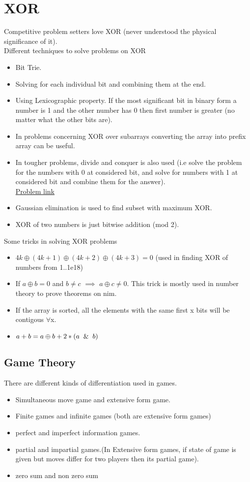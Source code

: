 \documentclass[../Notes.tex]{subfiles}
\begin{document}
\chapter{XOR}
Competitive problem setters love XOR (never understood the physical significance of it).\\

Different techniques to solve problems on XOR
\begin{itemize}
	\item Bit Trie.
	\item Solving for each individual bit and combining them at the end.
	\item Using Lexicographic property. If the most significant bit in binary form a number is 1 and the other number has 0 then first number is greater (no matter what the other bits are).
	\item In problems concerning XOR over subarrays converting the array into prefix array can be useful.
	\item In tougher problems, divide and conquer is also used (i.e solve the problem for the numbers with 0 at considered bit, and solve for numbers with 1 at considered bit and combine them for the answer).\\
	\href{https://www.codechef.com/MARCH12/problems/XOR/}{Problem link}
	\item Gaussian elimination is used to find subset with maximum XOR.
	\item XOR of two numbers is just bitwise addition (mod 2).
\end{itemize}

Some tricks in solving XOR problems
\begin{itemize}
	\item $4k\oplus(4k+1)\oplus(4k+2)\oplus(4k+3)=0$ (used in finding XOR of numbers from 1..1e18)
	\item If $a\oplus b=0$ and $b\neq c$ $\implies$ $a\oplus c\neq0$. This trick is mostly used in number theory to prove theorems on nim.
	\item If the array is sorted, all the elements with the same first x bits will be contigous $\forall$x.
	\item $a+b=a\oplus b + 2*(a\And b)$
\end{itemize}

\section{Game Theory}
There are different kinds of differentiation used in games.
\begin{itemize}
	\item Simultaneous move game and extensive form game.
	\item Finite games and infinite games (both are extensive form games)
	\item perfect and imperfect information games.
	\item partial and impartial games.(In Extensive form games, if state of game is given but moves differ for two players then its partial game).
	\item zero sum and non zero sum
\end{itemize}
\end{document}
